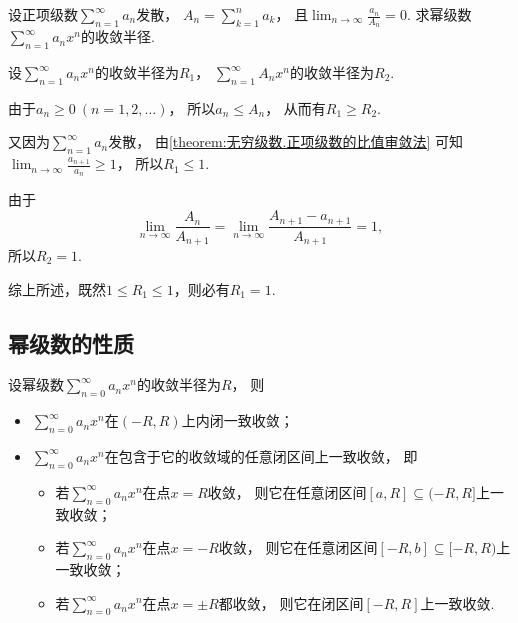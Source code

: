 \begin{example}
设正项级数\(\sum_{n=1}^\infty a_n\)发散，
\(A_n = \sum_{k=1}^n a_k\)，
且\(\lim_{n\to\infty} \frac{a_n}{A_n} = 0\).
求幂级数\(\sum_{n=1}^\infty a_n x^n\)的收敛半径.
\begin{solution}
设\(\sum_{n=1}^\infty a_n x^n\)的收敛半径为\(R_1\)，
\(\sum_{n=1}^\infty A_n x^n\)的收敛半径为\(R_2\).

由于\(a_n\geq0\ (n=1,2,\dotsc)\)，
所以\(a_n \leq A_n\)，
从而有\(R_1 \geq R_2\).

又因为\(\sum_{n=1}^\infty a_n\)发散，
由\cref{theorem:无穷级数.正项级数的比值审敛法} 可知
\(\lim_{n\to\infty} \frac{a_{n+1}}{a_n} \geq 1\)，
所以\(R_1 \leq 1\).

由于\[
	\lim_{n\to\infty} \frac{A_n}{A_{n+1}}
	= \lim_{n\to\infty} \frac{A_{n+1} - a_{n+1}}{A_{n+1}}
	= 1,
\]
所以\(R_2=1\).

综上所述，既然\(1 \leq R_1 \leq 1\)，则必有\(R_1=1\).
\end{solution}
\end{example}

\subsection{幂级数的性质}
\begin{theorem}[阿贝尔第二定理]\label{theorem:无穷级数.阿贝尔定理2}
设幂级数\(\sum_{n=0}^\infty a_n x^n\)的收敛半径为\(R\)，
则\begin{itemize}
	\item \(\sum_{n=0}^\infty a_n x^n\)在\((-R,R)\)上内闭一致收敛；
	\item \(\sum_{n=0}^\infty a_n x^n\)在包含于它的收敛域的任意闭区间上一致收敛，
	即\begin{itemize}
		\item 若\(\sum_{n=0}^\infty a_n x^n\)在点\(x=R\)收敛，
		则它在任意闭区间\([a,R]\subseteq(-R,R]\)上一致收敛；
		\item 若\(\sum_{n=0}^\infty a_n x^n\)在点\(x=-R\)收敛，
		则它在任意闭区间\([-R,b]\subseteq[-R,R)\)上一致收敛；
		\item 若\(\sum_{n=0}^\infty a_n x^n\)在点\(x=\pm R\)都收敛，
		则它在闭区间\([-R,R]\)上一致收敛.
	\end{itemize}
\end{itemize}
\end{theorem}

